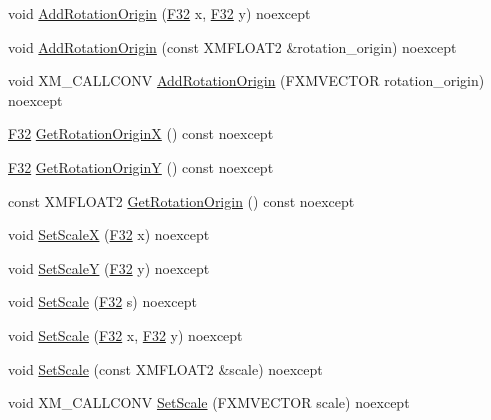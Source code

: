 \begin{DoxyCompactItemize}
\item 
void \hyperlink{classmage_1_1_texture_transform_a2ad2af24299e50c43b9f8ac459544f31}{Add\+Rotation\+Origin} (\hyperlink{namespacemage_aa97e833b45f06d60a0a9c4fc22ae02c0}{F32} x, \hyperlink{namespacemage_aa97e833b45f06d60a0a9c4fc22ae02c0}{F32} y) noexcept
\item 
void \hyperlink{classmage_1_1_texture_transform_aec89f0dc2732d0090802985b84418a2f}{Add\+Rotation\+Origin} (const X\+M\+F\+L\+O\+A\+T2 \&rotation\+\_\+origin) noexcept
\item 
void X\+M\+\_\+\+C\+A\+L\+L\+C\+O\+NV \hyperlink{classmage_1_1_texture_transform_a67e287acb98ea8aeeda4e3466859c8b6}{Add\+Rotation\+Origin} (F\+X\+M\+V\+E\+C\+T\+OR rotation\+\_\+origin) noexcept
\item 
\hyperlink{namespacemage_aa97e833b45f06d60a0a9c4fc22ae02c0}{F32} \hyperlink{classmage_1_1_texture_transform_a8cf3f245042d98a135b5d12ae590b2b2}{Get\+Rotation\+OriginX} () const noexcept
\item 
\hyperlink{namespacemage_aa97e833b45f06d60a0a9c4fc22ae02c0}{F32} \hyperlink{classmage_1_1_texture_transform_a2efe9088ae3532b188bab7c5b27238e6}{Get\+Rotation\+OriginY} () const noexcept
\item 
const X\+M\+F\+L\+O\+A\+T2 \hyperlink{classmage_1_1_texture_transform_ad23596d5d9bc99978c3bc0f54c280dec}{Get\+Rotation\+Origin} () const noexcept
\item 
void \hyperlink{classmage_1_1_texture_transform_ae038a7bf4d879c67e898db1fc8093900}{Set\+ScaleX} (\hyperlink{namespacemage_aa97e833b45f06d60a0a9c4fc22ae02c0}{F32} x) noexcept
\item 
void \hyperlink{classmage_1_1_texture_transform_a4bde9ccfddadb77589d0703bd7e394b6}{Set\+ScaleY} (\hyperlink{namespacemage_aa97e833b45f06d60a0a9c4fc22ae02c0}{F32} y) noexcept
\item 
void \hyperlink{classmage_1_1_texture_transform_aee6f84fbb4b7d57931aab72b6cec5b6c}{Set\+Scale} (\hyperlink{namespacemage_aa97e833b45f06d60a0a9c4fc22ae02c0}{F32} s) noexcept
\item 
void \hyperlink{classmage_1_1_texture_transform_ac3af8885cf4b4c6ad97138bbaf12cda1}{Set\+Scale} (\hyperlink{namespacemage_aa97e833b45f06d60a0a9c4fc22ae02c0}{F32} x, \hyperlink{namespacemage_aa97e833b45f06d60a0a9c4fc22ae02c0}{F32} y) noexcept
\item 
void \hyperlink{classmage_1_1_texture_transform_af9212429ef4851a8dfc028427c31bda1}{Set\+Scale} (const X\+M\+F\+L\+O\+A\+T2 \&scale) noexcept
\item 
void X\+M\+\_\+\+C\+A\+L\+L\+C\+O\+NV \hyperlink{classmage_1_1_texture_transform_a22ba108c7623abc2abdd8f9fde4d53bd}{Set\+Scale} (F\+X\+M\+V\+E\+C\+T\+OR scale) noexcept

\end{DoxyCompactItemize}
